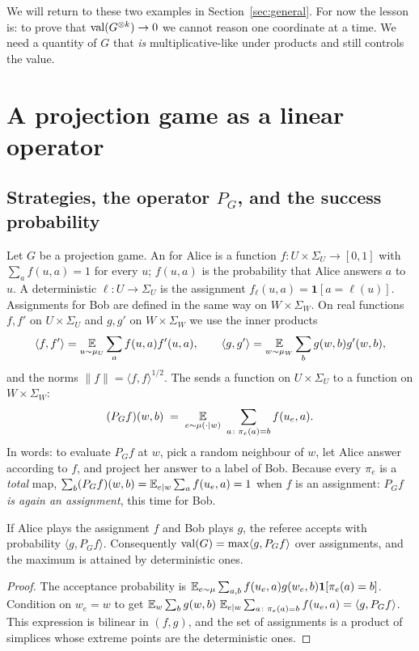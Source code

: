 We will return to these two examples in Section~\ref{sec:general}.  For now the lesson is: to prove that $\operatorname{val}(G^{\otimes k})\to0$ we cannot reason one coordinate at a time.  We need a quantity of $G$ that \emph{is} multiplicative-like under products and still controls the value.


\section{A projection game as a linear operator}
\label{sec:operator}

\subsection{Strategies, the operator $P_G$, and the success probability}

Let $G$ be a projection game.  An  for Alice is a function $f\colon U\times\Sigma_U\to[0,1]$ with $\sum_af(u,a)=1$ for every $u$; $f(u,a)$ is the probability that Alice answers $a$ to $u$.
A deterministic  $\ell\colon U\to\Sigma_U$ is the assignment $f_\ell(u,a)=\mathbf 1[a=\ell(u)]$.  Assignments for Bob are defined in the same way on $W\times\Sigma_W$.
On real functions $f,f'$ on $U\times\Sigma_U$ and $g,g'$ on $W\times\Sigma_W$ we use the inner products
\[
  \langle f,f'\rangle=\operatorname*{\mathbb{E}}_{u\sim\mu_U}\sum_af(u,a)f'(u,a),\qquad
  \langle g,g'\rangle=\operatorname*{\mathbb{E}}_{w\sim\mu_W}\sum_bg(w,b)g'(w,b),
\]
and the norms $\|f\|=\langle f,f\rangle^{1/2}$.
The  sends a function on $U\times\Sigma_U$ to a function on $W\times\Sigma_W$:
\[
  (P_Gf)(w,b)\;=\;\E_{e\sim\mu(\cdot\mid w)}\ \sum_{a\colon\pi_e(a)=b}f(u_e,a).
\]
In words: to evaluate $P_Gf$ at $w$, pick a random neighbour of $w$, let Alice answer according to $f$, and project her answer to a label of Bob.  Because every $\pi_e$ is a \emph{total} map, $\sum_b(P_Gf)(w,b)=\operatorname*{\mathbb{E}}_{e\mid w}\sum_af(u_e,a)=1$ when $f$ is an assignment:
\emph{$P_Gf$ is again an assignment}, this time for Bob.

\begin{lemma}\label{lem:bilinear}
If Alice plays the assignment $f$ and Bob plays $g$, the referee accepts with probability $\langle g,P_Gf\rangle$.  Consequently $\operatorname{val}(G)=\max\langle g,P_Gf\rangle$ over assignments, and the maximum is attained by deterministic ones.
\end{lemma}
\begin{proof}
The acceptance probability is $\operatorname*{\mathbb{E}}_{e\sim\mu}\sum_{a,b}f(u_e,a)g(w_e,b)\mathbf 1[\pi_e(a)=b]$.  Condition on $w_e=w$ to get $\operatorname*{\mathbb{E}}_w\sum_bg(w,b)\,\operatorname*{\mathbb{E}}_{e\mid w}\sum_{a\colon\pi_e(a)=b}f(u_e,a)=\langle g,P_Gf\rangle$.
This expression is bilinear in $(f,g)$, and the set of assignments is a product of simplices whose extreme points are the deterministic ones.
\end{proof}

